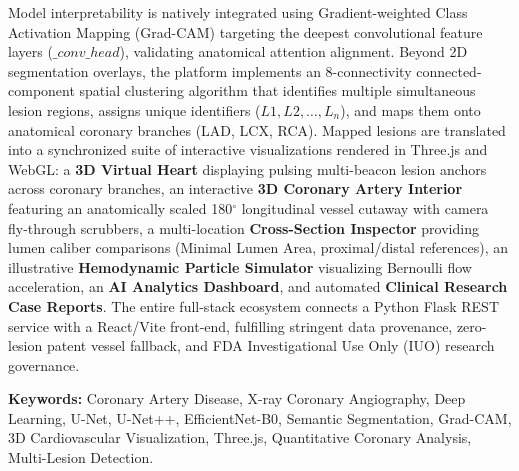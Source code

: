 Model interpretability is natively integrated using Gradient-weighted Class Activation Mapping (Grad-CAM) targeting the deepest convolutional feature layers ($\_conv\_head$), validating anatomical attention alignment. Beyond 2D segmentation overlays, the platform implements an 8-connectivity connected-component spatial clustering algorithm that identifies multiple simultaneous lesion regions, assigns unique identifiers ($L1, L2, \dots, L_n$), and maps them onto anatomical coronary branches (LAD, LCX, RCA). Mapped lesions are translated into a synchronized suite of interactive visualizations rendered in Three.js and WebGL: a \textbf{3D Virtual Heart} displaying pulsing multi-beacon lesion anchors across coronary branches, an interactive \textbf{3D Coronary Artery Interior} featuring an anatomically scaled 180$^\circ$ longitudinal vessel cutaway with camera fly-through scrubbers, a multi-location \textbf{Cross-Section Inspector} providing lumen caliber comparisons (Minimal Lumen Area, proximal/distal references), an illustrative \textbf{Hemodynamic Particle Simulator} visualizing Bernoulli flow acceleration, an \textbf{AI Analytics Dashboard}, and automated \textbf{Clinical Research Case Reports}. The entire full-stack ecosystem connects a Python Flask REST service with a React/Vite front-end, fulfilling stringent data provenance, zero-lesion patent vessel fallback, and FDA Investigational Use Only (IUO) research governance.

\vspace{0.8cm}
\noindent
\textbf{Keywords:} Coronary Artery Disease, X-ray Coronary Angiography, Deep Learning, U-Net, U-Net++, EfficientNet-B0, Semantic Segmentation, Grad-CAM, 3D Cardiovascular Visualization, Three.js, Quantitative Coronary Analysis, Multi-Lesion Detection.
